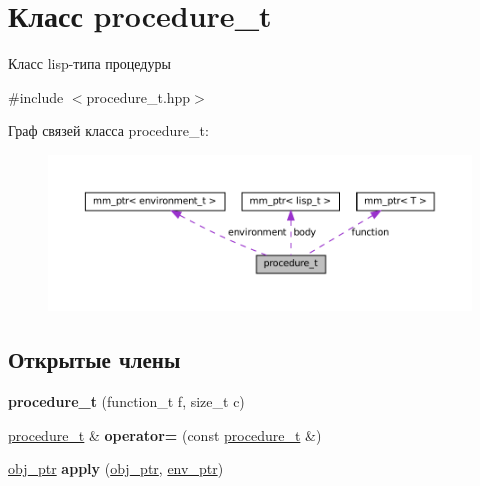 \hypertarget{classprocedure__t}{}\section{Класс procedure\+\_\+t}
\label{classprocedure__t}


Класс lisp-\/типа процедуры  




{\ttfamily \#include $<$procedure\+\_\+t.\+hpp$>$}



Граф связей класса procedure\+\_\+t\+:\nopagebreak
\begin{figure}[H]
\begin{center}
\leavevmode
\includegraphics[width=350pt]{classprocedure__t__coll__graph}
\end{center}
\end{figure}
\subsection*{Открытые члены}
\begin{DoxyCompactItemize}
\item 
\mbox{\label{classprocedure__t_a21d32b0db94eade1575ab4d7f7f8f73d}} 
{\bfseries procedure\+\_\+t} (function\+\_\+t f, size\+\_\+t c)
\item 
\mbox{\label{classprocedure__t_ac2ecc9ec7167a96bbc8b1af2b4911a4a}} 
\mbox{\hyperlink{classprocedure__t}{procedure\+\_\+t}} \& {\bfseries operator=} (const \mbox{\hyperlink{classprocedure__t}{procedure\+\_\+t}} \&)
\item 
\mbox{\label{classprocedure__t_a9f765845f3c00f6bfdb6602fc7462d9e}} 
\mbox{\hyperlink{classmm__ptr}{obj\+\_\+ptr}} {\bfseries apply} (\mbox{\hyperlink{classmm__ptr}{obj\+\_\+ptr}}, \mbox{\hyperlink{classmm__ptr}{env\+\_\+ptr}})
\end{DoxyCompactItemize}

